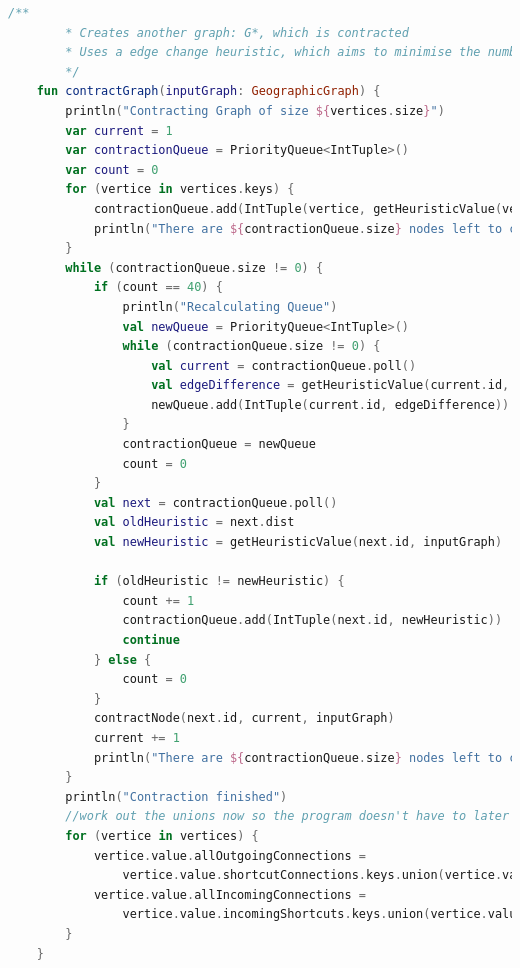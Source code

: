 \documentclass[11pt,twoside,a4paper]{report}
\begin{document}
\begin{lstlisting}[language=kotlin]
    /**
        * Creates another graph: G*, which is contracted
        * Uses a edge change heuristic, which aims to minimise the number of edges reduced
        */
    fun contractGraph(inputGraph: GeographicGraph) {
        println("Contracting Graph of size ${vertices.size}")
        var current = 1
        var contractionQueue = PriorityQueue<IntTuple>()
        var count = 0
        for (vertice in vertices.keys) {
            contractionQueue.add(IntTuple(vertice, getHeuristicValue(vertice, inputGraph)))
            println("There are ${contractionQueue.size} nodes left to contract")
        }
        while (contractionQueue.size != 0) {
            if (count == 40) {
                println("Recalculating Queue")
                val newQueue = PriorityQueue<IntTuple>()
                while (contractionQueue.size != 0) {
                    val current = contractionQueue.poll()
                    val edgeDifference = getHeuristicValue(current.id, inputGraph)
                    newQueue.add(IntTuple(current.id, edgeDifference))
                }
                contractionQueue = newQueue
                count = 0
            }
            val next = contractionQueue.poll()
            val oldHeuristic = next.dist
            val newHeuristic = getHeuristicValue(next.id, inputGraph)

            if (oldHeuristic != newHeuristic) {
                count += 1
                contractionQueue.add(IntTuple(next.id, newHeuristic))
                continue
            } else {
                count = 0
            }
            contractNode(next.id, current, inputGraph)
            current += 1
            println("There are ${contractionQueue.size} nodes left to contract")
        }
        println("Contraction finished")
        //work out the unions now so the program doesn't have to later when route finding
        for (vertice in vertices) {
            vertice.value.allOutgoingConnections =
                vertice.value.shortcutConnections.keys.union(vertice.value.connections.keys).toList()
            vertice.value.allIncomingConnections =
                vertice.value.incomingShortcuts.keys.union(vertice.value.incomingConnections.keys).toList()
        }
    }


\end{lstlisting}
\end{document}
